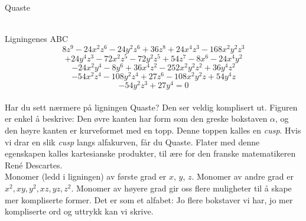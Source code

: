 \documentclass[no]{./../../common/SurferDesc}%
\begin{document}
\footnotesize





\begin{surferPage}
  \begin{surferTitle}Quaste\end{surferTitle} \\
Ligningenes ABC
  \smallskip
\[8z^9-24x^2z^6-24y^2z^6+36z^8+24x^4z^3-168x^2y^2z^3\]
\[+24y^4z^3-72x^2z^5-72y^2z^5+54z^7-8x^6-24x^4y^2\]
\[-24x^2y^4-8y^6 + 36x^4z^2-252x^2y^2z^2+36y^4z^2\]
\[- 54x^2z^4-108y^2z^4 + 27z^6-108x^2y^2z + 54y^4z\]
\[-54y^2z^3 + 27y^4 = 0\]\\
\vspace{0.3cm}
Har du sett nærmere på ligningen Quaste? Den ser veldig komplisert ut. Figuren er enkel å beskrive: Den øvre kanten har form som den greske bokstaven $\alpha$, og den høyre kanten er kurveformet med en topp. Denne toppen kalles en {\it cusp}. Hvis vi drar en slik {\it cusp} langs alfakurven, får du Quaste. Flater med denne egenskapen kalles kartesianske produkter, til ære for den franske matematikeren Ren\'e Descartes.\\
\vspace{0.3cm}
Monomer (ledd i ligningen) av første grad er $x$, $y$, $z$. Monomer av andre grad er $x^2, xy, y^2, xz, yz, z^2$. Monomer av høyere grad gir oss flere muligheter til å skape mer kompliserte former. Det er som et alfabet: Jo flere bokstaver vi har, jo mer kompliserte ord og uttrykk kan vi skrive.  




  \begin{surferText}
     \end{surferText}
\end{surferPage}
\end{document}
